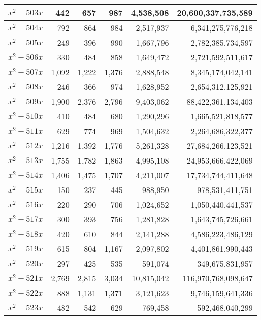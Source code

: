 \documentclass[a4paper]{amsproc}
\theoremstyle{plain}
\theoremstyle{named}
\begin{document}
\begin{longtable}{ | l | r | r | r | r | r | }
$x^2 + 503x$ & 442 & 657 & 987 & 4{,}538{,}508 & 20{,}600{,}337{,}735{,}589 \\ \hline
$x^2 + 504x$ & 792 & 864 & 984 & 2{,}517{,}937 & 6{,}341{,}275{,}776{,}218 \\ \hline
$x^2 + 505x$ & 249 & 396 & 990 & 1{,}667{,}796 & 2{,}782{,}385{,}734{,}597 \\ \hline
$x^2 + 506x$ & 330 & 484 & 858 & 1{,}649{,}472 & 2{,}721{,}592{,}511{,}617 \\ \hline
$x^2 + 507x$ & 1{,}092 & 1{,}222 & 1{,}376 & 2{,}888{,}548 & 8{,}345{,}174{,}042{,}141 \\ \hline
$x^2 + 508x$ & 246 & 366 & 974 & 1{,}628{,}952 & 2{,}654{,}312{,}125{,}921 \\ \hline
$x^2 + 509x$ & 1{,}900 & 2{,}376 & 2{,}796 & 9{,}403{,}062 & 88{,}422{,}361{,}134{,}403 \\ \hline
$x^2 + 510x$ & 410 & 484 & 680 & 1{,}290{,}296 & 1{,}665{,}521{,}818{,}577 \\ \hline
$x^2 + 511x$ & 629 & 774 & 969 & 1{,}504{,}632 & 2{,}264{,}686{,}322{,}377 \\ \hline
$x^2 + 512x$ & 1{,}216 & 1{,}392 & 1{,}776 & 5{,}261{,}328 & 27{,}684{,}266{,}123{,}521 \\ \hline
$x^2 + 513x$ & 1{,}755 & 1{,}782 & 1{,}863 & 4{,}995{,}108 & 24{,}953{,}666{,}422{,}069 \\ \hline
$x^2 + 514x$ & 1{,}406 & 1{,}475 & 1{,}707 & 4{,}211{,}007 & 17{,}734{,}744{,}411{,}648 \\ \hline
$x^2 + 515x$ & 150 & 237 & 445 & 988{,}950 & 978{,}531{,}411{,}751 \\ \hline
$x^2 + 516x$ & 220 & 290 & 706 & 1{,}024{,}652 & 1{,}050{,}440{,}441{,}537 \\ \hline
$x^2 + 517x$ & 300 & 393 & 756 & 1{,}281{,}828 & 1{,}643{,}745{,}726{,}661 \\ \hline
$x^2 + 518x$ & 420 & 610 & 844 & 2{,}141{,}288 & 4{,}586{,}223{,}486{,}129 \\ \hline
$x^2 + 519x$ & 615 & 804 & 1{,}167 & 2{,}097{,}802 & 4{,}401{,}861{,}990{,}443 \\ \hline
$x^2 + 520x$ & 297 & 425 & 535 & 591{,}074 & 349{,}675{,}831{,}957 \\ \hline
$x^2 + 521x$ & 2{,}769 & 2{,}815 & 3{,}034 & 10{,}815{,}042 & 116{,}970{,}768{,}098{,}647 \\ \hline
$x^2 + 522x$ & 888 & 1{,}131 & 1{,}371 & 3{,}121{,}623 & 9{,}746{,}159{,}641{,}336 \\ \hline
$x^2 + 523x$ & 482 & 542 & 629 & 769{,}458 & 592{,}468{,}040{,}299 \\ \hline

\end{longtable}
\end{document}
